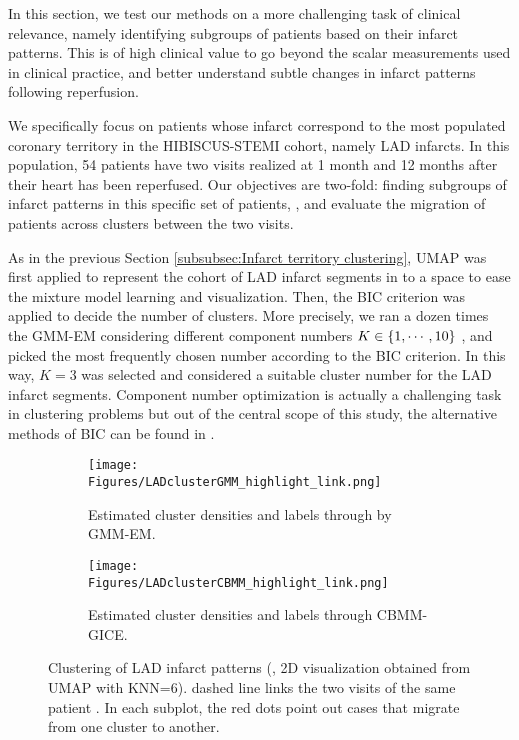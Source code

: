 In this section, we test our methods on a more challenging task of clinical relevance, namely identifying subgroups of patients based on their infarct patterns. This is of high clinical value to go beyond the scalar measurements used in clinical practice, and better understand subtle changes in infarct patterns following reperfusion.

We specifically focus on patients whose infarct correspond to the most populated coronary territory in the HIBISCUS-STEMI cohort, namely LAD infarcts. In this population,
54 patients have two visits realized at 1 month and 12 months after their heart has been reperfused. Our objectives are two-fold: finding subgroups of infarct patterns in this specific set of patients, , and evaluate the migration of patients across clusters between the two visits.

As in the previous Section \ref{subsubsec:Infarct territory clustering}, UMAP was first applied to represent the cohort of LAD infarct segments in to a  space to ease the mixture model learning and visualization. 
Then, the BIC criterion was applied to decide the number of clusters. More precisely, we ran a dozen times the GMM-EM considering different component numbers $K\in\left\{1,\cdots,10\right\}$ , and picked the most frequently chosen number according to the BIC criterion. In this way, $K=3$ was selected and considered a suitable cluster number for the LAD infarct segments.
Component number optimization is actually a challenging task in clustering problems but out of the central scope of this study, the alternative methods of BIC can be found in \cite{hancer2017comprehensive}.

\begin{figure}[tb]
\centering
\begin{subfigure}[t]{0.48\textwidth}
  \centering
  \texttt{[image: Figures/LADclusterGMM\_highlight\_link.png]}
  \captionsetup{width=.95\linewidth}
  \caption{Estimated cluster densities and labels through by GMM-EM. }
  \label{fig:LADclusterGMM}
\end{subfigure} \hfill
\begin{subfigure}[t]{0.48\textwidth}
  \centering
  \texttt{[image: Figures/LADclusterCBMM\_highlight\_link.png]}
  \captionsetup{width=.95\linewidth}
  \caption{Estimated cluster densities and labels through CBMM-GICE. }
  \label{fig:LADclusterCBMM}
\end{subfigure}
\caption{Clustering of LAD infarct patterns (, 2D visualization obtained from UMAP with KNN=6).  dashed line links the two visits of the same patient .  
In each subplot, the red dots point out cases that migrate from one cluster to another.}
\label{fig:LADClust_figures}
\end{figure}

